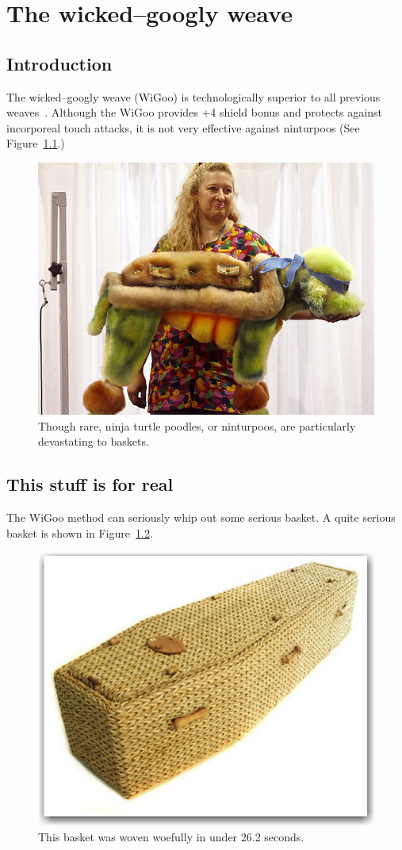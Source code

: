 
\chapter{The wicked--googly weave}

\section{Introduction}

The wicked--googly weave (WiGoo) is technologically superior to all previous weaves~\cite{Science}.
Although the WiGoo provides +4 shield bonus and protects against incorporeal touch attacks, it is not very effective against ninturpoos (See Figure~\ref{fig:ninturpoos}.)

\begin{figure}
  \centering
  \includegraphics[scale=0.5]{figures/ntp}
  \caption{Though rare, ninja turtle poodles, or ninturpoos, are particularly devastating to baskets.}
  \label{fig:ninturpoos}
\end{figure}


\section{This stuff is for real}

The WiGoo method can seriously whip out some serious basket.
A quite serious basket is shown in Figure~\ref{fig:serious}.

\begin{figure}
  \centering
  \includegraphics[scale=0.5]{figures/sbskt}
  \caption{This basket was woven woefully in under 26.2 seconds.}
  \label{fig:serious}
\end{figure}
